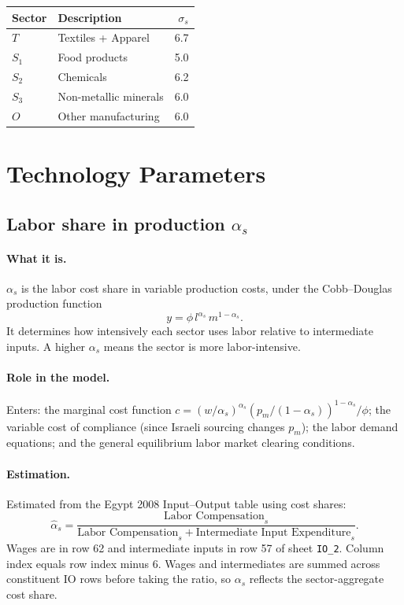 \documentclass[12pt]{article}
\begin{document}
\begin{center}
\begin{tabular}{llr}
\toprule
Sector & Description & $\sigma_s$ \\
\midrule
$T$   & Textiles + Apparel    & 6.7 \\
$S_1$ & Food products         & 5.0 \\
$S_2$ & Chemicals             & 6.2 \\
$S_3$ & Non-metallic minerals & 6.0 \\
$O$   & Other manufacturing   & 6.0 \\
\bottomrule
\end{tabular}
\end{center}

\section{Technology Parameters}

\subsection{Labor share in production $\alpha_s$}

\paragraph{What it is.}
$\alpha_s$ is the labor cost share in variable production costs, under the
Cobb--Douglas production function
\[
y = \phi\, l^{\alpha_s}\, m^{1-\alpha_s}.
\]
It determines how intensively each sector uses labor relative to intermediate
inputs. A higher $\alpha_s$ means the sector is more labor-intensive.

\paragraph{Role in the model.}
Enters: the marginal cost function $c = (w/\alpha_s)^{\alpha_s}
(p_m/(1-\alpha_s))^{1-\alpha_s} / \phi$; the variable cost of compliance
(since Israeli sourcing changes $p_m$); the labor demand equations; and the
general equilibrium labor market clearing conditions.

\paragraph{Estimation.}
Estimated from the Egypt 2008 Input--Output table using cost shares:
\[
\hat\alpha_s =
\frac{\text{Labor Compensation}_s}
{\text{Labor Compensation}_s + \text{Intermediate Input Expenditure}_s}.
\]
Wages are in row 62 and intermediate inputs in row 57 of sheet
\texttt{IO\_2}. Column index equals row index minus 6.
Wages and intermediates are summed across constituent IO rows before taking
the ratio, so $\alpha_s$ reflects the sector-aggregate cost share.
\end{document}
